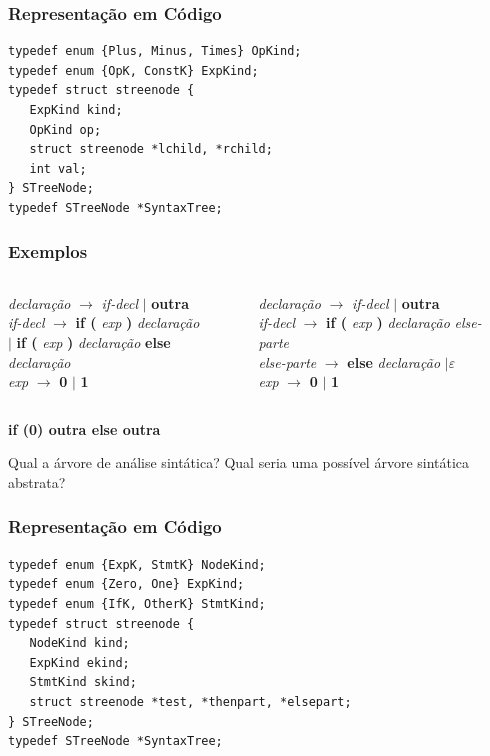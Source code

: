 \documentclass[table]{beamer}
\begin{document}
\begin{frame}[fragile]
   \frametitle{Representação em Código}
   \begin{verbatim}
typedef enum {Plus, Minus, Times} OpKind;
typedef enum {OpK, ConstK} ExpKind;
typedef struct streenode {
   ExpKind kind;
   OpKind op;
   struct streenode *lchild, *rchild;
   int val;
} STreeNode;
typedef STreeNode *SyntaxTree;
   \end{verbatim}
\end{frame}

\begin{frame}
   \frametitle{Exemplos}
   \begin{columns}
   \begin{column}{0.5\textwidth}
      \textit{declaração} $\to$ \textit{if-decl} $|$ \textbf{outra} \\
      \textit{if-decl} $\to$ \textbf{if (} \textit{exp} \textbf{)} \textit{declaração} \\
      \hspace{1.3cm} $|$ \textbf{if (} \textit{exp} \textbf{)} \textit{declaração} \textbf{else} \textit{declaração} \\
      \textit{exp} $\to$ \textbf{0} $|$ \textbf{1}
   \end{column}
   \begin{column}{0.5\textwidth}
      \textit{declaração} $\to$ \textit{if-decl} $|$ \textbf{outra} \\
      \textit{if-decl} $\to$ \textbf{if (} \textit{exp} \textbf{)} \textit{declaração} \textit{else-parte} \\ 
      \textit{else-parte} $\to$ \textbf{else} \textit{declaração} $| \varepsilon$ \\
      \textit{exp} $\to$ \textbf{0} $|$ \textbf{1}
   \end{column}
   \end{columns}
   \begin{center}
   \textbf{if (0) outra else outra}
   \end{center}
   Qual a árvore de análise sintática? Qual seria uma possível árvore sintática abstrata?
\end{frame}

\begin{frame}[fragile]
   \frametitle{Representação em Código}
   \begin{verbatim}
typedef enum {ExpK, StmtK} NodeKind;
typedef enum {Zero, One} ExpKind;
typedef enum {IfK, OtherK} StmtKind;
typedef struct streenode {
   NodeKind kind;
   ExpKind ekind;
   StmtKind skind;
   struct streenode *test, *thenpart, *elsepart;
} STreeNode;
typedef STreeNode *SyntaxTree;
   \end{verbatim}
\end{frame}
\end{document}
